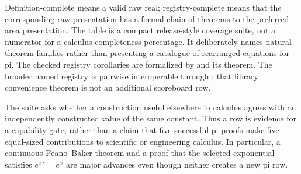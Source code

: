 Definition-complete means a valid raw real; registry-complete means that the
corresponding raw presentation has a formal chain of 
theorems to the preferred area presentation.  The table is a compact
release-style coverage suite, not a numerator for a calculus-completeness
percentage.  It deliberately names natural theorem families rather than
presenting a catalogue of rearranged equations for pi.  The checked registry
corollaries are formalized by  and its
 theorem.
The broader named registry is pairwise interoperable through
; that library convenience theorem is not
an additional scoreboard row.

The suite asks whether a construction useful elsewhere in calculus agrees
with an independently constructed value of the same constant.  Thus a row is
evidence for a capability gate, rather than a claim that five successful pi
proofs make five equal-sized contributions to scientific or engineering
calculus.  In particular, a continuous Peano--Baker theorem and a proof that
the selected exponential satisfies \(e^x{}'=e^x\) are major advances even
though neither creates a new pi row.

